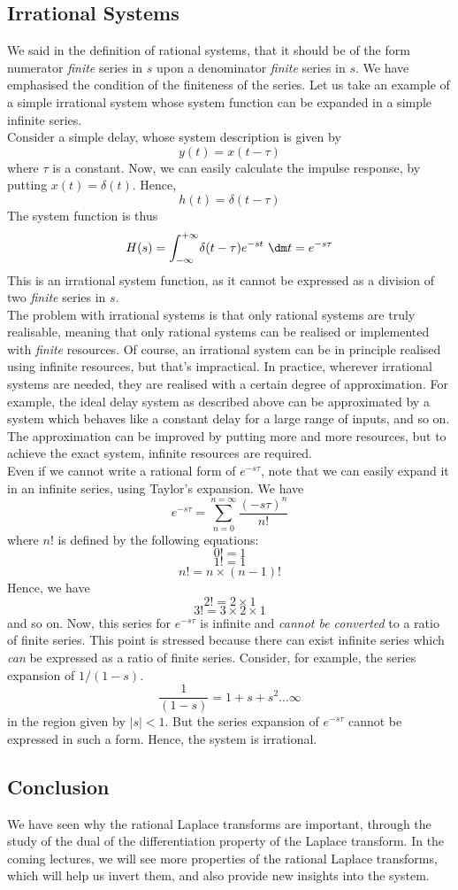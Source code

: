 \subsection{Irrational Systems}
We said in the definition of rational systems, that it should be of the form numerator \emph{finite} series in $s$ upon a denominator \emph{finite} series in $s$. We have emphasised the condition of the finiteness of the series. Let us take an example of a simple irrational system whose system function can be expanded in a simple infinite series.\\
Consider a simple delay, whose system description is given by
\[
y(t)=x(t-\tau)
\]
where $\tau$ is a constant. Now, we can easily calculate the impulse response, by putting $x(t)=\delta(t)$. Hence,
\[
h(t)=\delta(t-\tau)
\]
The system function is thus
\[
H(s)=\int_{-\infty}^{+\infty} \! \delta(t-\tau)e^{-st} \ \dm t = e^{-s\tau}
\]
This is an irrational system function, as it cannot be expressed as a division of two \emph{finite} series in $s$.\\
The problem with irrational systems is that only rational systems are truly realisable, meaning that only rational systems can be realised or implemented with \emph{finite} resources. Of course, an irrational system can be in principle realised using infinite resources, but that's impractical. In practice, wherever irrational systems are needed, they are realised with a certain degree of approximation. For example, the ideal delay system as described above can be approximated by a system which behaves like a constant delay for a large range of inputs, and so on. The approximation can be improved by putting more and more resources, but to achieve the exact system, infinite resources are required.\\
Even if we cannot write a rational form of $e^{-s\tau}$, note that we can easily expand it in an infinite series, using Taylor's expansion. We have
\[
e^{-s\tau} = \sum_{n=0}^{n=\infty} \! \frac{(-s\tau)^n}{n!}
\]
where $n!$ is defined by the following equations:
\[ 0! = 1 \] \[ 1!=1 \] \[ n!=n \times (n-1)! \]
Hence, we have
\[ 2! = 2 \times 1 \] \[ 3! = 3 \times 2 \times 1 \]
and so on.
Now, this series for $e^{-s\tau}$ is infinite and \emph{cannot be converted} to a ratio of finite series. This point is stressed because there can exist infinite series which \emph{can} be expressed as a ratio of finite series. Consider, for example, the series expansion of $1/(1-s)$.
\[
\frac{1}{(1-s)} = 1+s+s^2...\infty
\]
in the region given by $|s|<1$. But the series expansion of $e^{-s\tau}$ cannot be expressed in such a form. Hence, the system is irrational.

\subsection{Conclusion}
We have seen why the rational Laplace transforms are important, through the study of the dual of the differentiation property of the Laplace transform. In the coming lectures, we will see more properties of the rational Laplace transforms, which will help us invert them, and also provide new insights into the system.
